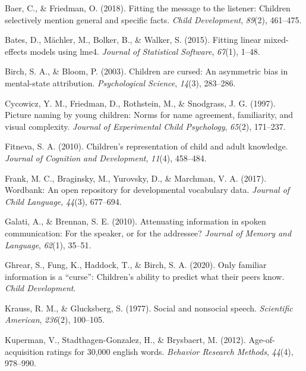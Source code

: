 \documentclass[10pt, letterpaper]{article}
\newenvironment{CSLReferences}%
  {}%
  {\par}
\begin{document}
\hypertarget{refs}{}
\begin{CSLReferences}
\leavevmode\hypertarget{ref-baer2018}{}%
Baer, C., \& Friedman, O. (2018). Fitting the message to the listener:
Children selectively mention general and specific facts. \emph{Child
Development}, \emph{89}(2), 461--475.

\leavevmode\hypertarget{ref-bates2015}{}%
Bates, D., Mächler, M., Bolker, B., \& Walker, S. (2015). Fitting linear
mixed-effects models using {lme4}. \emph{Journal of Statistical
Software}, \emph{67}(1), 1--48.

\leavevmode\hypertarget{ref-birch2003}{}%
Birch, S. A., \& Bloom, P. (2003). Children are cursed: An asymmetric
bias in mental-state attribution. \emph{Psychological Science},
\emph{14}(3), 283--286.

\leavevmode\hypertarget{ref-cycowicz1997}{}%
Cycowicz, Y. M., Friedman, D., Rothstein, M., \& Snodgrass, J. G.
(1997). Picture naming by young children: Norms for name agreement,
familiarity, and visual complexity. \emph{Journal of Experimental Child
Psychology}, \emph{65}(2), 171--237.

\leavevmode\hypertarget{ref-fitneva2010}{}%
Fitneva, S. A. (2010). Children's representation of child and adult
knowledge. \emph{Journal of Cognition and Development}, \emph{11}(4),
458--484.

\leavevmode\hypertarget{ref-frank2017}{}%
Frank, M. C., Braginsky, M., Yurovsky, D., \& Marchman, V. A. (2017).
Wordbank: An open repository for developmental vocabulary data.
\emph{Journal of Child Language}, \emph{44}(3), 677--694.

\leavevmode\hypertarget{ref-galati2010}{}%
Galati, A., \& Brennan, S. E. (2010). Attenuating information in spoken
communication: For the speaker, or for the addressee? \emph{Journal of
Memory and Language}, \emph{62}(1), 35--51.

\leavevmode\hypertarget{ref-ghrear2020}{}%
Ghrear, S., Fung, K., Haddock, T., \& Birch, S. A. (2020). Only familiar
information is a {``curse''}: Children's ability to predict what their
peers know. \emph{Child Development}.

\leavevmode\hypertarget{ref-krauss1977}{}%
Krauss, R. M., \& Glucksberg, S. (1977). Social and nonsocial speech.
\emph{Scientific American}, \emph{236}(2), 100--105.

\leavevmode\hypertarget{ref-kuperman2012}{}%
Kuperman, V., Stadthagen-Gonzalez, H., \& Brysbaert, M. (2012).
Age-of-acquisition ratings for 30,000 english words. \emph{Behavior
Research Methods}, \emph{44}(4), 978--990.


\end{CSLReferences}
\end{document}
